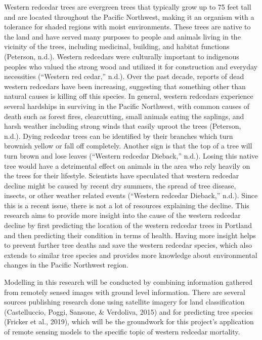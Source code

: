 \documentclass[12pt,twoside]{reedthesis}
\begin{document}
Western redcedar trees are evergreen trees that typically grow up to 75 feet tall and are located throughout the Pacific Northwest, making it an organism with a tolerance for shaded regions with moist environments. These trees are native to the land and have served many purposes to people and animals living in the vicinity of the trees, including medicinal, building, and habitat functions (Peterson, n.d.). Western redcedars were culturally important to indigenous peoples who valued the strong wood and utilized it for construction and everyday necessities (``Western red cedar,'' n.d.). Over the past decade, reports of dead western redcedars have been increasing, suggesting that something other than natural causes is killing off this species. In general, western redcedars experience several hardships in surviving in the Pacific Northwest, with common causes of death such as forest fires, clearcutting, small animals eating the saplings, and harsh weather including strong winds that easily uproot the trees (Peterson, n.d.). Dying redcedar trees can be identified by their branches which turn brownish yellow or fall off completely. Another sign is that the top of a tree will turn brown and lose leaves (``Western redcedar Dieback,'' n.d.). Losing this native tree would have a detrimental effect on animals in the area who rely heavily on the trees for their lifestyle. Scientists have speculated that western redcedar decline might be caused by recent dry summers, the spread of tree disease, insects, or other weather related events (``Western redcedar Dieback,'' n.d.). Since this is a recent issue, there is not a lot of resources explaining the decline. This research aims to provide more insight into the cause of the western redcedar decline by first predicting the location of the western redcedar trees in Portland and then predicting their condition in terms of health. Having more insight helps to prevent further tree deaths and save the western redcedar species, which also extends to similar tree species and provides more knowledge about environmental changes in the Pacific Northwest region.

Modelling in this research will be conducted by combining information gathered from remotely sensed images with ground level information. There are several sources publishing research done using satellite imagery for land classification (Castelluccio, Poggi, Sansone, \& Verdoliva, 2015) and for predicting tree species (Fricker et al., 2019), which will be the groundwork for this project's application of remote sensing models to the specific topic of western redcedar mortality.
\end{document}
